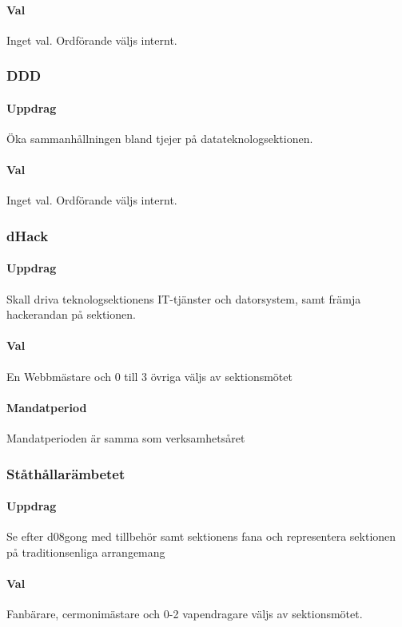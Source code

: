 \documentclass[a4paper, 10pt]{article}
\begin{document}
\paragraph{Val\\}
Inget val. Ordförande väljs internt. 
\subsubsection{DDD}
\paragraph{Uppdrag\\}
Öka sammanhållningen bland tjejer på datateknologsektionen. 
\paragraph{Val\\}
Inget val. Ordförande väljs internt.
\subsubsection{dHack}
\paragraph{Uppdrag\\}
Skall driva teknologsektionens IT-tjänster och datorsystem, samt
främja hackerandan på sektionen.
\paragraph{Val\\}
En Webbmästare och 0 till 3 övriga väljs av sektionsmötet
\paragraph{Mandatperiod\\}
Mandatperioden är samma som verksamhetsåret
\subsubsection{Ståthållarämbetet}
\paragraph{Uppdrag\\}
Se efter d08gong med tillbehör samt sektionens fana och representera sektionen på traditionsenliga arrangemang
\paragraph{Val\\}
Fanbärare, cermonimästare och 0-2 vapendragare väljs av sektionsmötet.
\end{document}
